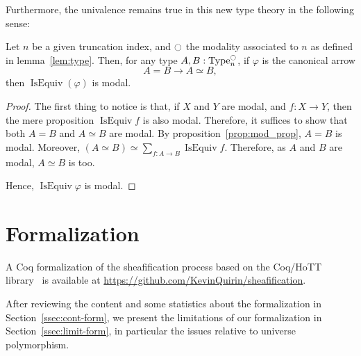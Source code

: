 \documentclass[notfinal]{jfrarticle}
\DeclareMathOperator{\Type}{Type}
\DeclareMathOperator{\IsEquiv}{IsEquiv}
\newcommand{\modal}{\ensuremath{\ocircle}}
\begin{document}
Furthermore, the univalence remains
true in this new type theory in the following sense:
\begin{prop}\label{prop:univalence}
  Let $n$ be a given truncation index, and $\modal$ the modality
  associated to $n$ as defined in lemma~\ref{lem:type}. Then, for
  any type $A,B:\Type_n^\modal$, if $\varphi$ is the canonical arrow
  $$A = B \to A\simeq B,$$
  then $\IsEquiv(\varphi)$ is modal.
\end{prop}
\begin{proof}
  The first thing to notice is that, if $X$ and $Y$ are modal, and
  $f:X \to Y$, then the mere proposition $\IsEquiv f$ is also modal.
  Therefore, it suffices to show that both $A=B$ and $A\simeq B$ are
  modal. By proposition~\ref{prop:mod_prop}, $A=B$ is modal. 
  Moreover, $(A\simeq B) \simeq \sum_{f:A\to B} \IsEquiv
  f$. Therefore, as $A$ and $B$ are modal, $A\simeq B$ is too. 

  Hence, $\IsEquiv \varphi$ is modal.
\end{proof}


\section{Formalization}
\label{sec:sheaf-formalization}

A Coq formalization of the sheafification process based on the
Coq/HoTT library~\cite{hottlib} is available at
\url{https://github.com/KevinQuirin/sheafification}.

After reviewing the content and some statistics about the
formalization in Section~\ref{ssec:cont-form}, we present the
limitations of our formalization in Section~\ref{ssec:limit-form}, in
particular the issues relative to universe polymorphism. 
\end{document}
